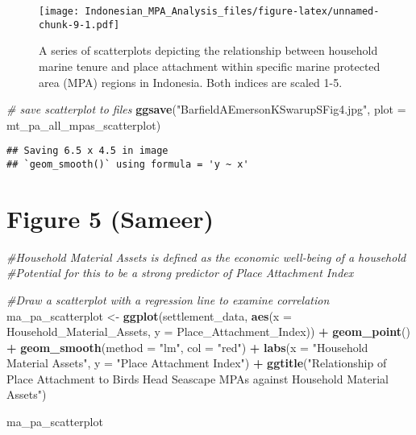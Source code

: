 \documentclass[
]{article}
\newenvironment{Shaded}{\begin{snugshade}}{\end{snugshade}}
\newcommand{\AttributeTok}[1]{\textcolor[rgb]{0.13,0.29,0.53}{#1}}
\newcommand{\CommentTok}[1]{\textcolor[rgb]{0.56,0.35,0.01}{\textit{#1}}}
\newcommand{\FunctionTok}[1]{\textcolor[rgb]{0.13,0.29,0.53}{\textbf{#1}}}
\newcommand{\NormalTok}[1]{#1}
\newcommand{\OtherTok}[1]{\textcolor[rgb]{0.56,0.35,0.01}{#1}}
\newcommand{\SpecialCharTok}[1]{\textcolor[rgb]{0.81,0.36,0.00}{\textbf{#1}}}
\newcommand{\StringTok}[1]{\textcolor[rgb]{0.31,0.60,0.02}{#1}}
\begin{document}
\begin{figure}
\centering
\texttt{[image: Indonesian\_MPA\_Analysis\_files/figure-latex/unnamed-chunk-9-1.pdf]}
\caption{A series of scatterplots depicting the relationship between
household marine tenure and place attachment within specific marine
protected area (MPA) regions in Indonesia. Both indices are scaled 1-5.}
\end{figure}

\begin{Shaded}
\begin{Highlighting}[]
\CommentTok{\# save scatterplot to files }
\FunctionTok{ggsave}\NormalTok{(}\StringTok{"BarfieldAEmersonKSwarupSFig4.jpg"}\NormalTok{, }\AttributeTok{plot =}\NormalTok{ mt\_pa\_all\_mpas\_scatterplot)}
\end{Highlighting}
\end{Shaded}

\begin{verbatim}
## Saving 6.5 x 4.5 in image
## `geom_smooth()` using formula = 'y ~ x'
\end{verbatim}

\section{Figure 5 (Sameer)}\label{figure-5-sameer}

\begin{Shaded}
\begin{Highlighting}[]
\CommentTok{\#Household Material Assets is defined as the economic well{-}being of a household}
\CommentTok{\#Potential for this to be a strong predictor of Place Attachment Index}

\CommentTok{\#Draw a scatterplot with a regression line to examine correlation}
\NormalTok{ma\_pa\_scatterplot }\OtherTok{\textless{}{-}} \FunctionTok{ggplot}\NormalTok{(settlement\_data, }\FunctionTok{aes}\NormalTok{(}\AttributeTok{x =}\NormalTok{ Household\_Material\_Assets, }\AttributeTok{y =}\NormalTok{ Place\_Attachment\_Index)) }\SpecialCharTok{+}
  \FunctionTok{geom\_point}\NormalTok{() }\SpecialCharTok{+}
  \FunctionTok{geom\_smooth}\NormalTok{(}\AttributeTok{method =} \StringTok{"lm"}\NormalTok{, }\AttributeTok{col =} \StringTok{"red"}\NormalTok{) }\SpecialCharTok{+}
  \FunctionTok{labs}\NormalTok{(}\AttributeTok{x =} \StringTok{"Household Material Assets"}\NormalTok{,}
       \AttributeTok{y =} \StringTok{"Place Attachment Index"}\NormalTok{) }\SpecialCharTok{+}
  \FunctionTok{ggtitle}\NormalTok{(}\StringTok{"Relationship of Place Attachment to Bird\textquotesingle{}s Head Seascape MPAs against }
\StringTok{          Household Material Assets"}\NormalTok{)}

\NormalTok{ma\_pa\_scatterplot}
\end{Highlighting}
\end{Shaded}
\end{document}
